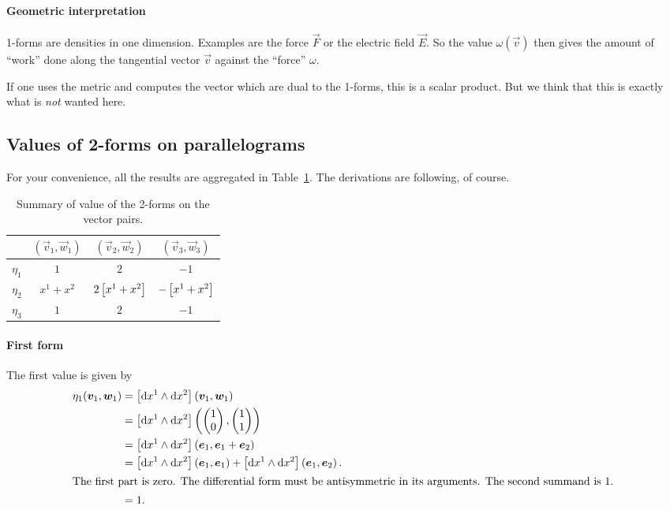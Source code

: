 \documentclass[11pt, english, fleqn, DIV=15, headinclude, BCOR=1cm]{scrartcl}
\begin{document}
\paragraph{Geometric interpretation}

1-forms are densities in one dimension. Examples are the force $\vec F$ or the
electric field $\vec E$. So the value $\omega(\vec v)$ then gives the amount of
“work” done along the tangential vector $\vec v$ against the “force” $\omega$.

If one uses the metric and computes the vector which are dual to the 1-forms,
this is a scalar product. But we think that this is exactly what is \emph{not}
wanted here.

\subsection{Values of 2-forms on parallelograms}

For your convenience, all the results are aggregated in
Table~\ref{tab:values2}. The derivations are following, of course.

\begin{table}[htbp]
    \centering
    \begin{tabular}{c|ccc}
        & $(\vec v_1, \vec w_1)$ & $(\vec v_2, \vec w_2)$ & $(\vec v_3, \vec w_3)$ \\
        \midrule
        $\eta_1$ & $1$ & $2$ & $-1$ \\
        $\eta_2$ & $x^1+x^2$ & $2\left[ x^1+x^2 \right]$ & $-\left[ x^1+x^2 \right]$ \\
        $\eta_3$ & $1$ & $2$ & $-1$
    \end{tabular}
    \caption{%
        Summary of value of the 2-forms on the vector pairs.
    }
    \label{tab:values2}
\end{table}

\paragraph{First form}

The first value is given by
\begin{align*}
    \eta_1(\vec v_1, \vec w_1)
    &= \sbr{\dif x^1 \wedge \dif x^2}(\vec v_1, \vec w_1) \\
    &= \sbr{\dif x^1 \wedge \dif x^2} \del{
        \begin{pmatrix}
            1 \\ 0
        \end{pmatrix},
        \begin{pmatrix}
            1 \\ 1
        \end{pmatrix}
    } \\
    &= \sbr{\dif x^1 \wedge \dif x^2} \del{\ev_1, \ev_1 + \ev_2} \\
    &= \sbr{\dif x^1 \wedge \dif x^2} \del{\ev_1, \ev_1}
    + \sbr{\dif x^1 \wedge \dif x^2} \del{\ev_1, \ev_2}. \\
    \intertext{%
        The first part is zero. The differential form must be antisymmetric in
        its arguments. The second summand is 1.
    }
    &= 1.
\end{align*}
\end{document}
